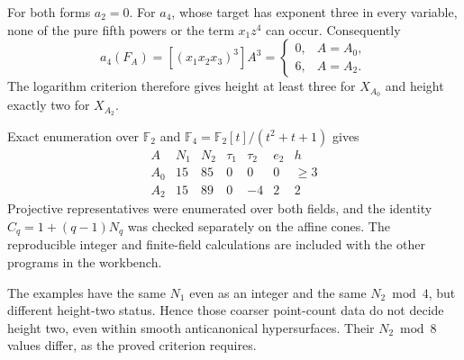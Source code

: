 For both forms $a_2=0$. For $a_4$, whose target has exponent three
in every variable, none of the pure fifth powers or the term
$x_1z^4$ can occur. Consequently
\[
 a_4(F_A)=[(x_1x_2x_3)^3]A^3
 =\begin{cases}0,&A=A_0,\\6,&A=A_2.\end{cases}
\]
The logarithm criterion therefore gives height at least three for
$X_{A_0}$ and height exactly two for $X_{A_2}$.

Exact enumeration over $\mathbb F_2$ and
$\mathbb F_4=\mathbb F_2[t]/(t^2+t+1)$ gives
\[
\begin{array}{c|rrrrrr}
 A&N_1&N_2&\tau_1&\tau_2&e_2&h\\\hline
 A_0&15&85&0&0&0&\ge3\\
 A_2&15&89&0&-4&2&2
\end{array}
\]
Projective representatives were enumerated over both fields, and the
identity $C_q=1+(q-1)N_q$ was checked separately on the affine cones.
The reproducible integer and finite-field calculations are included
with the other programs in the workbench.


The examples have the same $N_1$ even as an integer and the same
$N_2\bmod4$, but different height-two status. Hence those coarser
point-count data do not decide height two, even within smooth
anticanonical hypersurfaces. Their $N_2\bmod8$ values differ, as
the proved criterion requires.
